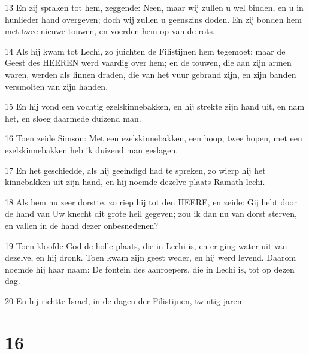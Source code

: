 \par 13 En zij spraken tot hem, zeggende: Neen, maar wij zullen u wel binden, en u in hunlieder hand overgeven; doch wij zullen u geenszins doden. En zij bonden hem met twee nieuwe touwen, en voerden hem op van de rots.
\par 14 Als hij kwam tot Lechi, zo juichten de Filistijnen hem tegemoet; maar de Geest des HEEREN werd vaardig over hem; en de touwen, die aan zijn armen waren, werden als linnen draden, die van het vuur gebrand zijn, en zijn banden versmolten van zijn handen.
\par 15 En hij vond een vochtig ezelskinnebakken, en hij strekte zijn hand uit, en nam het, en sloeg daarmede duizend man.
\par 16 Toen zeide Simson: Met een ezelskinnebakken, een hoop, twee hopen, met een ezelskinnebakken heb ik duizend man geslagen.
\par 17 En het geschiedde, als hij geeindigd had te spreken, zo wierp hij het kinnebakken uit zijn hand, en hij noemde dezelve plaats Ramath-lechi.
\par 18 Als hem nu zeer dorstte, zo riep hij tot den HEERE, en zeide: Gij hebt door de hand van Uw knecht dit grote heil gegeven; zou ik dan nu van dorst sterven, en vallen in de hand dezer onbesnedenen?
\par 19 Toen kloofde God de holle plaats, die in Lechi is, en er ging water uit van dezelve, en hij dronk. Toen kwam zijn geest weder, en hij werd levend. Daarom noemde hij haar naam: De fontein des aanroepers, die in Lechi is, tot op dezen dag.
\par 20 En hij richtte Israel, in de dagen der Filistijnen, twintig jaren.

\chapter{16}

